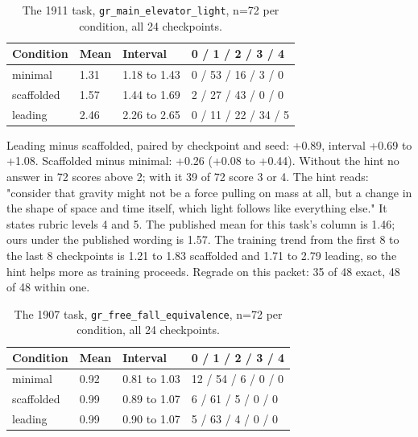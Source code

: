 \documentclass[reprint,prx,amsmath,amssymb,aps,superscriptaddress]{revtex4-2}
\begin{document}
\begin{table}[t]
\caption{The 1911 task, \texttt{gr\_main\_elevator\_light}, n=72 per condition, all 24 checkpoints.}
\begin{ruledtabular}
\begin{tabular}{llll}
Condition & Mean & Interval & 0 / 1 / 2 / 3 / 4 \\
\hline
minimal & 1.31 & 1.18 to 1.43 & 0 / 53 / 16 / 3 / 0 \\
scaffolded & 1.57 & 1.44 to 1.69 & 2 / 27 / 43 / 0 / 0 \\
leading & 2.46 & 2.26 to 2.65 & 0 / 11 / 22 / 34 / 5 \\
\end{tabular}
\end{ruledtabular}
\end{table}

Leading minus scaffolded, paired by checkpoint and seed: +0.89, interval +0.69 to +1.08. Scaffolded minus minimal: +0.26 (+0.08 to +0.44). Without the hint no answer in 72 scores above 2; with it 39 of 72 score 3 or 4. The hint reads: "consider that gravity might not be a force pulling on mass at all, but a change in the shape of space and time itself, which light follows like everything else." It states rubric levels 4 and 5. The published mean for this task's column is 1.46; ours under the published wording is 1.57. The training trend from the first 8 to the last 8 checkpoints is 1.21 to 1.83 scaffolded and 1.71 to 2.79 leading, so the hint helps more as training proceeds. Regrade on this packet: 35 of 48 exact, 48 of 48 within one.

\begin{table}[t]
\caption{The 1907 task, \texttt{gr\_free\_fall\_equivalence}, n=72 per condition, all 24 checkpoints.}
\begin{ruledtabular}
\begin{tabular}{llll}
Condition & Mean & Interval & 0 / 1 / 2 / 3 / 4 \\
\hline
minimal & 0.92 & 0.81 to 1.03 & 12 / 54 / 6 / 0 / 0 \\
scaffolded & 0.99 & 0.89 to 1.07 & 6 / 61 / 5 / 0 / 0 \\
leading & 0.99 & 0.90 to 1.07 & 5 / 63 / 4 / 0 / 0 \\
\end{tabular}
\end{ruledtabular}
\end{table}
\end{document}

